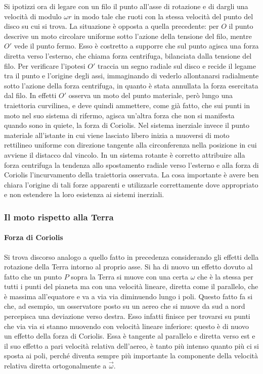 Si ipotizzi ora di legare con un filo il punto all'asse di rotazione e di dargli una velocità di modulo $\omega r$ in modo tale che ruoti con la stessa velocità del punto del disco su cui si trova. La situazione è opposta a quella precedente: per $O$ il punto descrive un moto circolare uniforme sotto l'azione della tensione del filo, mentre $O'$ vede il punto fermo. Esso è costretto a supporre che sul punto agisca una forza diretta verso l'esterno, che chiama forza centrifuga, bilanciata dalla tensione del filo. Per verificare l'ipotesi $O'$ traccia un segno radiale sul disco e recide il legame tra il punto e l'origine degli assi, immaginando di vederlo allontanarsi radialmente sotto l'azione della forza centrifuga, in quanto è stata annullata la forza esercitata dal filo. In effetti $O'$ osserva un moto del punto materiale, però lungo una traiettoria curvilinea, e deve quindi ammettere, come già fatto, che sui punti in moto nel suo sistema di rifermo, agisca un'altra forza che non si manifesta quando sono in quiete, la forza di Coriolis. Nel sistema inerziale invece il punto materiale all'istante in cui viene lasciato libero inizia a muoversi di moto rettilineo uniforme con direzione tangente alla circonferenza nella posizione in cui avviene il distacco dal vincolo.  In un sistema rotante è corretto attribuire alla forza centrifuga la tendenza allo spostamento radiale verso l'esterno e alla forza di Coriolis l'incurvamento della traiettoria osservata. La cosa importante è avere ben chiara l'origine di tali forze apparenti e utilizzarle correttamente dove appropriato e non estendere la loro esistenza ai sistemi inerziali.

\subsubsection{Il moto rispetto alla Terra}

\paragraph{Forza di Coriolis} Si trova discorso analogo a quello fatto in precedenza considerando gli effetti della rotazione della Terra intorno al proprio asse. Si ha di nuovo un effetto dovuto al fatto che un punto $P$ sopra la Terra si muove con una certa $\omega$ che è la stessa per tutti i punti del pianeta ma con una velocità lineare, diretta come il parallelo, che è massima all'equatore e va a via via diminuendo lungo i poli. Questo fatto fa si che, ad esempio, un osservatore posto su un aereo che si muove da sud a nord percepisca una deviazione verso destra. Esso infatti finisce per trovarsi su punti che via via si stanno muovendo con velocità lineare inferiore: questo è di nuovo un effetto della forza di Coriolis. Essa è tangente al parallelo e diretta verso est e il suo effetto a pari velocità relativa dell'aereo, è tanto più intenso quanto più ci si sposta ai poli, perché diventa sempre più importante la componente della velocità relativa diretta ortogonalmente a $\vec{\omega}$.


